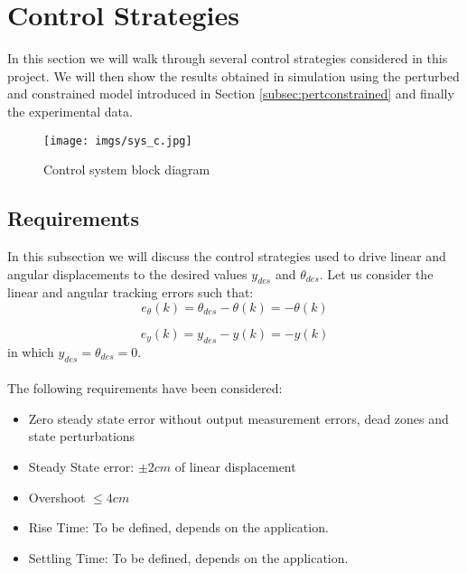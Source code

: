 {\color{PineGreen}\section{Control Strategies}}
In this section we will walk through several control strategies considered in this project. We will then show the results obtained in simulation using the perturbed and constrained model introduced in Section \ref{subsec:pertconstrained} and finally the experimental data.
\begin{center}
	\begin{figure}[H]
	    \texttt{[image: imgs/sys\_c.jpg]}
 		\caption{Control system block diagram}
 		\label{fig:system}
	\end{figure}
\end{center}
{\color{PineGreen}\subsection{Requirements}\label{subsec:requirements}}
In this subsection we will discuss the control strategies used to drive linear and angular displacements to the desired values $y_{des}$ and $\theta_{des}$. Let us consider the linear and angular tracking errors such that:
\begin{equation}
\label{eq:errors_theta}
    e_{\theta}(k) = \theta_{des} - \theta(k) = -\theta(k)
\end{equation}

\begin{equation}
\label{eq:errors_theta}
    e_{y}(k) = y_{des} - y(k) = -y(k)
\end{equation}
in which $ y_{des} = \theta_{des} = 0$.\\
\\
The following requirements have been considered:
\begin{itemize}
	\item Zero steady state error without output measurement errors, dead zones and state perturbations
	\item Steady State error: $\pm 2 cm$ of linear displacement
	\item Overshoot {\color{PineGreen}$\leq 4cm$}
	\item Rise Time: {\color{PineGreen}To be defined, depends on the application.}
	\item Settling Time: {\color{PineGreen}To be defined, depends on the application.}
\end{itemize}
\vspace{3cm}


